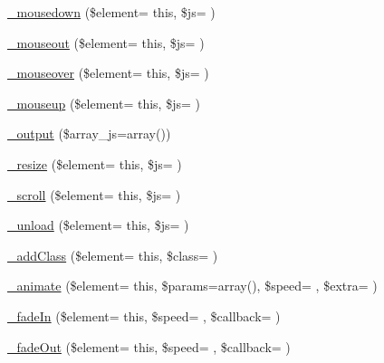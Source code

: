 \begin{DoxyCompactItemize}
\hyperlink{class_c_i___jquery_a302e802a5cf2fa5592c47da43ce188dd}{\+\_\+mousedown} (\$element= \textquotesingle{}this\textquotesingle{}, \$js= \textquotesingle{}\textquotesingle{})
\item 
\hyperlink{class_c_i___jquery_a2b281e648122112c34511be1d0eb99ad}{\+\_\+mouseout} (\$element= \textquotesingle{}this\textquotesingle{}, \$js= \textquotesingle{}\textquotesingle{})
\item 
\hyperlink{class_c_i___jquery_a591a97a67846ab69c0e66daa317d62ab}{\+\_\+mouseover} (\$element= \textquotesingle{}this\textquotesingle{}, \$js= \textquotesingle{}\textquotesingle{})
\item 
\hyperlink{class_c_i___jquery_a0206c9182950f2128741884303734c93}{\+\_\+mouseup} (\$element= \textquotesingle{}this\textquotesingle{}, \$js= \textquotesingle{}\textquotesingle{})
\item 
\hyperlink{class_c_i___jquery_a6a837913fb7adb3e611aa97a89d56a6e}{\+\_\+output} (\$array\+\_\+js=array())
\item 
\hyperlink{class_c_i___jquery_a4baae3a09859adaddeb8fcc7a2ed8386}{\+\_\+resize} (\$element= \textquotesingle{}this\textquotesingle{}, \$js= \textquotesingle{}\textquotesingle{})
\item 
\hyperlink{class_c_i___jquery_a421a3d5a5bf8a2d8a05a052069b40088}{\+\_\+scroll} (\$element= \textquotesingle{}this\textquotesingle{}, \$js= \textquotesingle{}\textquotesingle{})
\item 
\hyperlink{class_c_i___jquery_a59807618bf76c97f6c0472f876051b60}{\+\_\+unload} (\$element= \textquotesingle{}this\textquotesingle{}, \$js= \textquotesingle{}\textquotesingle{})
\item 
\hyperlink{class_c_i___jquery_a6afbbff5385fb0882dac4b748e798f44}{\+\_\+add\+Class} (\$element= \textquotesingle{}this\textquotesingle{}, \$class= \textquotesingle{}\textquotesingle{})
\item 
\hyperlink{class_c_i___jquery_af2bf0a3a184a09ace21405af7eb8fc9b}{\+\_\+animate} (\$element= \textquotesingle{}this\textquotesingle{}, \$params=array(), \$speed= \textquotesingle{}\textquotesingle{}, \$extra= \textquotesingle{}\textquotesingle{})
\item 
\hyperlink{class_c_i___jquery_a73933d1d9b7b750a61c77f6e45ca9b05}{\+\_\+fade\+In} (\$element= \textquotesingle{}this\textquotesingle{}, \$speed= \textquotesingle{}\textquotesingle{}, \$callback= \textquotesingle{}\textquotesingle{})
\item 
\hyperlink{class_c_i___jquery_a89f60fad5c0220845cf2743babc41274}{\+\_\+fade\+Out} (\$element= \textquotesingle{}this\textquotesingle{}, \$speed= \textquotesingle{}\textquotesingle{}, \$callback= \textquotesingle{}\textquotesingle{})

\end{DoxyCompactItemize}
